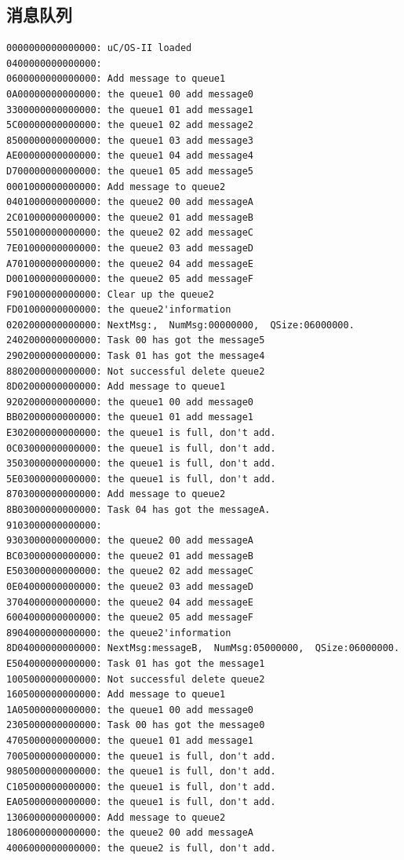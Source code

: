 \documentclass{ctexart}
\begin{document}
    \subsection{消息队列}
    \begin{lstlisting}[language={}]
0000000000000000: uC/OS-II loaded
0400000000000000:
0600000000000000: Add message to queue1
0A00000000000000: the queue1 00 add message0
3300000000000000: the queue1 01 add message1
5C00000000000000: the queue1 02 add message2
8500000000000000: the queue1 03 add message3
AE00000000000000: the queue1 04 add message4
D700000000000000: the queue1 05 add message5
0001000000000000: Add message to queue2
0401000000000000: the queue2 00 add messageA
2C01000000000000: the queue2 01 add messageB
5501000000000000: the queue2 02 add messageC
7E01000000000000: the queue2 03 add messageD
A701000000000000: the queue2 04 add messageE
D001000000000000: the queue2 05 add messageF
F901000000000000: Clear up the queue2
FD01000000000000: the queue2'information
0202000000000000: NextMsg:,  NumMsg:00000000,  QSize:06000000.
2402000000000000: Task 00 has got the message5
2902000000000000: Task 01 has got the message4
8802000000000000: Not successful delete queue2
8D02000000000000: Add message to queue1
9202000000000000: the queue1 00 add message0
BB02000000000000: the queue1 01 add message1
E302000000000000: the queue1 is full, don't add.
0C03000000000000: the queue1 is full, don't add.
3503000000000000: the queue1 is full, don't add.
5E03000000000000: the queue1 is full, don't add.
8703000000000000: Add message to queue2
8B03000000000000: Task 04 has got the messageA.
9103000000000000:
9303000000000000: the queue2 00 add messageA
BC03000000000000: the queue2 01 add messageB
E503000000000000: the queue2 02 add messageC
0E04000000000000: the queue2 03 add messageD
3704000000000000: the queue2 04 add messageE
6004000000000000: the queue2 05 add messageF
8904000000000000: the queue2'information
8D04000000000000: NextMsg:messageB,  NumMsg:05000000,  QSize:06000000.
E504000000000000: Task 01 has got the message1
1005000000000000: Not successful delete queue2
1605000000000000: Add message to queue1
1A05000000000000: the queue1 00 add message0
2305000000000000: Task 00 has got the message0
4705000000000000: the queue1 01 add message1
7005000000000000: the queue1 is full, don't add.
9805000000000000: the queue1 is full, don't add.
C105000000000000: the queue1 is full, don't add.
EA05000000000000: the queue1 is full, don't add.
1306000000000000: Add message to queue2
1806000000000000: the queue2 00 add messageA
4006000000000000: the queue2 is full, don't add.

\end{lstlisting}
\end{document}
